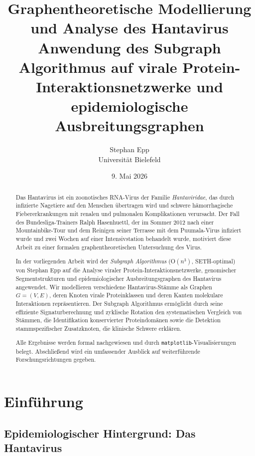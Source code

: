 ﻿\documentclass[a4paper,12pt]{article}
\title{%
    \textbf{Graphentheoretische Modellierung und Analyse des Hantavirus}\\
    \large Anwendung des Subgraph Algorithmus auf virale Protein-Interaktionsnetzwerke
    und epidemiologische Ausbreitungsgraphen
}
\author{Stephan Epp\\Universit\"at Bielefeld}
\date{9. Mai 2026}
\theoremstyle{definition}
\begin{document}
\maketitle

\begin{abstract}
Das Hantavirus ist ein zoonotisches RNA-Virus der Familie \emph{Hantaviridae}, das
durch infizierte Nagetiere auf den Menschen \"ubertragen wird und schwere h\"amorrhagische
Fiebererkrankungen mit renalen und pulmonalen Komplikationen verursacht.
Der Fall des Bundesliga-Trainers Ralph Hasenhuettl, der im Sommer 2012
nach einer Mountainbike-Tour und dem Reinigen seiner Terrasse mit dem Puumala-Virus
infiziert wurde und zwei Wochen auf einer Intensivstation behandelt wurde, motiviert
diese Arbeit zu einer formalen graphentheoretischen Untersuchung des Virus.

In der vorliegenden Arbeit wird der \emph{Subgraph Algorithmus} (O$(n^3)$,
SETH-optimal) von Stephan Epp auf die Analyse viraler Protein-Interaktionsnetzwerke,
genomischer Segmentstrukturen und epidemiologischer Ausbreitungsgraphen des Hantavirus
angewendet. Wir modellieren verschiedene Hantavirus-St\"amme als Graphen
$G = (V, E)$, deren Knoten virale Proteinklassen und deren Kanten
molekulare Interaktionen repr\"asentieren. Der Subgraph Algorithmus erm\"oglicht
durch seine effiziente Signaturberechnung und zyklische Rotation den systematischen
Vergleich von St\"ammen, die Identifikation konservierter Proteindom\"anen sowie
die Detektion stammspezifischer Zusatzknoten, die klinische Schwere erkl\"aren.

Alle Ergebnisse werden formal nachgewiesen und durch \texttt{matplotlib}-Visualisierungen
belegt. Abschlie{\ss}end wird ein umfassender Ausblick auf weiterf\"uhrende
Forschungsrichtungen gegeben.
\end{abstract}

\newpage
\tableofcontents
\newpage

\section{Einf\"uhrung}

\subsection{Epidemiologischer Hintergrund: Das Hantavirus}
\end{document}
